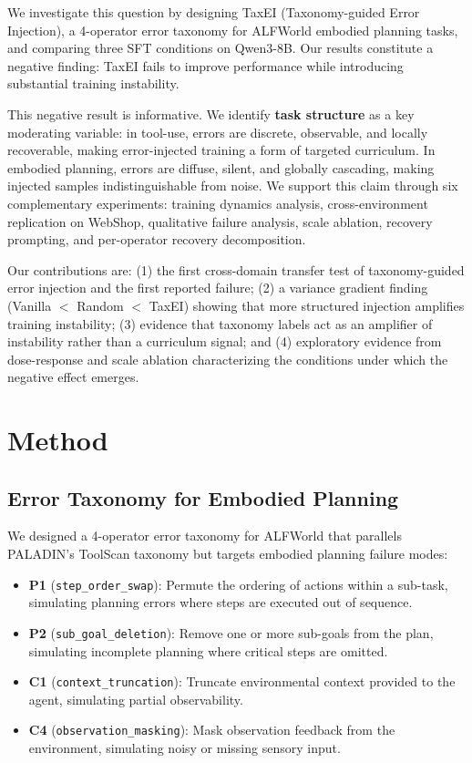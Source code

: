 \documentclass[11pt,a4paper]{article}
\begin{document}
We investigate this question by designing TaxEI (Taxonomy-guided Error Injection), a 4-operator error taxonomy for ALFWorld embodied planning tasks, and comparing three SFT conditions on Qwen3-8B. Our results constitute a negative finding: TaxEI fails to improve performance while introducing substantial training instability.

This negative result is informative. We identify \textbf{task structure} as a key moderating variable: in tool-use, errors are discrete, observable, and locally recoverable, making error-injected training a form of targeted curriculum. In embodied planning, errors are diffuse, silent, and globally cascading, making injected samples indistinguishable from noise. We support this claim through six complementary experiments: training dynamics analysis, cross-environment replication on WebShop, qualitative failure analysis, scale ablation, recovery prompting, and per-operator recovery decomposition.

Our contributions are: (1) the first cross-domain transfer test of taxonomy-guided error injection and the first reported failure; (2) a variance gradient finding (Vanilla $<$ Random $<$ TaxEI) showing that more structured injection amplifies training instability; (3) evidence that taxonomy labels act as an amplifier of instability rather than a curriculum signal; and (4) exploratory evidence from dose-response and scale ablation characterizing the conditions under which the negative effect emerges.

\section{Method}
\label{sec:method}

\subsection{Error Taxonomy for Embodied Planning}

We designed a 4-operator error taxonomy for ALFWorld that parallels PALADIN's ToolScan taxonomy but targets embodied planning failure modes:

\begin{itemize}
    \item \textbf{P1} (\texttt{step\_order\_swap}): Permute the ordering of actions within a sub-task, simulating planning errors where steps are executed out of sequence.
    \item \textbf{P2} (\texttt{sub\_goal\_deletion}): Remove one or more sub-goals from the plan, simulating incomplete planning where critical steps are omitted.
    \item \textbf{C1} (\texttt{context\_truncation}): Truncate environmental context provided to the agent, simulating partial observability.
    \item \textbf{C4} (\texttt{observation\_masking}): Mask observation feedback from the environment, simulating noisy or missing sensory input.
\end{itemize}
\end{document}
